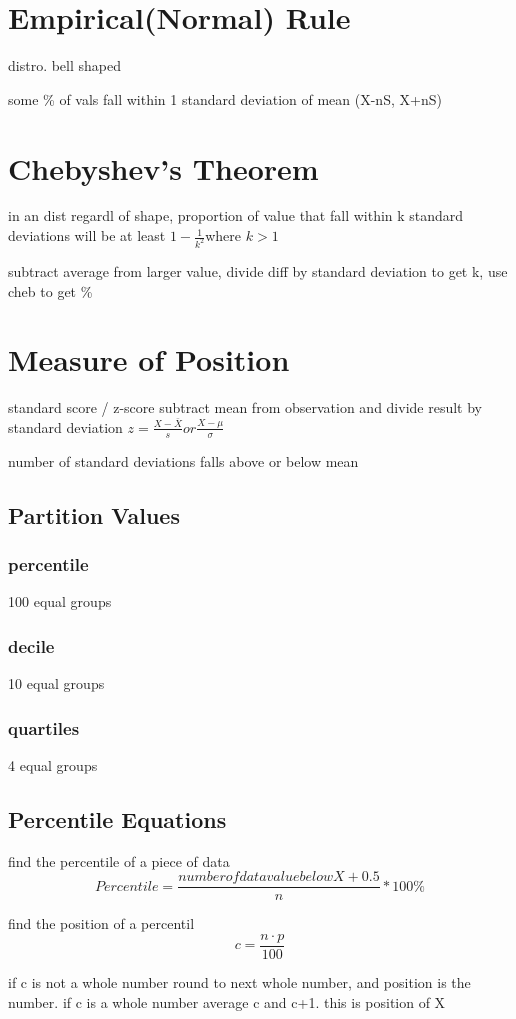\documentclass[11pt]{amsart}
\begin{document}
\section{Empirical(Normal) Rule}
\par distro. bell shaped
\par some \% of vals fall within 1 standard deviation of mean (X-nS, X+nS)
\section{Chebyshev's Theorem}
\par in an dist regardl of shape, proportion of value that fall within k standard deviations will be at least $1-\frac{1}{k^2}$where $k > 1$
\par subtract average from larger value, divide diff by standard deviation to get k, use cheb to get \%
\section{Measure of Position}
\par standard score / z-score subtract mean from observation and divide result by standard deviation $z = \frac {X - \bar{X}}{s}  or  \frac{X - \mu}{\sigma} $
\par number of standard deviations falls above or below mean
\subsection{Partition Values}
\subsubsection{percentile}
\par 100 equal groups
\subsubsection{decile}
\par 10 equal groups
\subsubsection{quartiles}
\par 4 equal groups
\subsection{Percentile Equations}
\par find the percentile of a piece of data
\begin{equation}
  Percentile = \frac{number of data value below X + 0.5}{n} * 100\%
\end{equation}
\par find the position of a percentil
\begin{equation}
  c = \frac{n \cdot p}{100}
\end{equation}
\par if c is not a whole number round to next whole number, and position is
the number. if c is a whole number average c and c+1. this is position of
X
\end{document}
